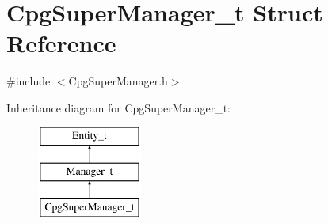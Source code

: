 \hypertarget{structCpgSuperManager__t}{
\section{CpgSuperManager\_\-t Struct Reference}
\label{structCpgSuperManager__t}
}


{\ttfamily \#include $<$CpgSuperManager.h$>$}

Inheritance diagram for CpgSuperManager\_\-t:\begin{figure}[H]
\begin{center}
\leavevmode
\includegraphics[height=3.000000cm]{structCpgSuperManager__t}
\end{center}
\end{figure}
